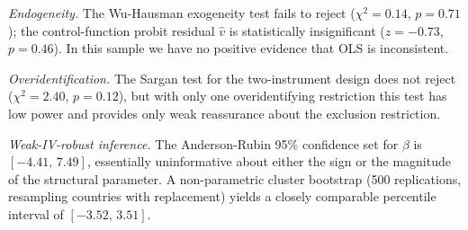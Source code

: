 \documentclass[11pt,a4paper]{article}
\begin{document}
\emph{Endogeneity.}
The Wu-Hausman exogeneity test fails to reject ($\chi^2=0.14$,
$p=0.71$); the control-function probit residual $\hat v$ is
statistically insignificant ($z=-0.73$, $p=0.46$). In this sample
we have no positive evidence that OLS is inconsistent.

\emph{Overidentification.}
The Sargan test for the two-instrument design does not reject
($\chi^2=2.40$, $p=0.12$), but with only one overidentifying
restriction this test has low power and provides only weak
reassurance about the exclusion restriction.

\emph{Weak-IV-robust inference.}
The Anderson-Rubin 95\% confidence set for $\beta$ is
$[-4.41,\,7.49]$, essentially uninformative about either the sign or
the magnitude of the structural parameter. A non-parametric cluster
bootstrap (500 replications, resampling countries with replacement)
yields a closely comparable percentile interval of $[-3.52,\,3.51]$.
\end{document}
